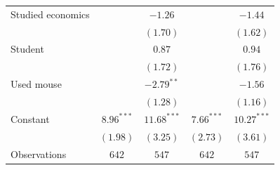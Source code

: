 \begin{tabular}{l c c c c}
Studied economics        &              & $-1.26$       &              & $-1.44$       \\
                         &              & $(1.70)$      &              & $(1.62)$      \\
Student                  &              & $0.87$        &              & $0.94$        \\
                         &              & $(1.72)$      &              & $(1.76)$      \\
Used mouse               &              & $-2.79^{**}$  &              & $-1.56$       \\
                         &              & $(1.28)$      &              & $(1.16)$      \\
Constant                 & $8.96^{***}$ & $11.68^{***}$ & $7.66^{***}$ & $10.27^{***}$ \\
                         & $(1.98)$     & $(3.25)$      & $(2.73)$     & $(3.61)$      \\
\midrule
Observations                & $642$        & $547$         & $642$        & $547$         \\
\bottomrule
\end{tabular}
